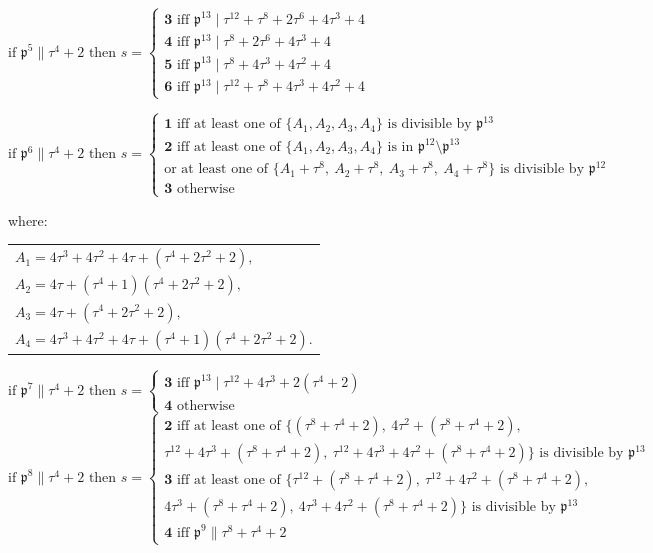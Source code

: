 \documentclass[12pt]{article}
\theoremstyle{remark}
\newcommand{\p}{\mathfrak{p}}
\begin{document}
\noindent
$ \text{if } \mathfrak{p}^5 \parallel \tau^4+2 \text{ then } s = \begin{cases}
    \textbf{3} \text{ iff } \mathfrak{p}^{13} \mid \tau^{12}+\tau^8+2\tau^6+4\tau^3+4\\
    \textbf{4} \text{ iff } \mathfrak{p}^{13} \mid \tau^8+2\tau^6+4\tau^3+4\\
    \textbf{5} \text{ iff } \mathfrak{p}^{13} \mid  \tau^8+4\tau^3+4\tau^2+4\\
    \textbf{6} \text{ iff } \mathfrak{p}^{13} \mid  \tau^{12}+\tau^8+4\tau^3+4\tau^2+4
\end{cases} $

\noindent
$\text{if } \mathfrak{p}^6 \parallel \tau^4+2 \text{ then } s = \begin{cases}
    \textbf{1} \text{ iff at least one of } \{A_1,A_2,A_3,A_4\} \text{ is divisible by } \mathfrak{p}^{13} \\
    \textbf{2} \text{ iff at least one of } \{A_1,A_2,A_3,A_4\}  \text{ is in } \mathfrak{p}^{12}\setminus\p^{13} \\
    \text{or at least one of } \{A_1+\tau^8, \ A_2+\tau^8, \ A_3+\tau^8, \ A_4+\tau^8\} \text{ is divisible by } \mathfrak{p}^{12} \\
    \textbf{3} \text{ otherwise}
\end{cases}$
\begin{center}
where:
\begin{tabular}{@{}l@{}}
    $A_1 = 4\tau^3+4\tau^2+4\tau+(\tau^4+2\tau^2+2),$\\
    $A_2 = 4\tau + (\tau^4+1)(\tau^4+2\tau^2+2),$\\
    $A_3 = 4\tau + (\tau^4+2\tau^2+2), $\\
    $A_4= 4\tau^3+4\tau^2+4\tau+(\tau^4+1)(\tau^4+2\tau^2+2). $
\end{tabular}
\end{center}
$\text{if } \mathfrak{p}^7 \parallel \tau^4+2 \text{ then } s = \begin{cases}
    \textbf{3} \text{ iff } \mathfrak{p}^{13} \mid \tau^{12}+4\tau^3+2(\tau^4+2)\\
    \textbf{4} \text{ otherwise}
\end{cases}$ 
\\
$\text{if } \mathfrak{p}^8 \parallel \tau^4+2 \text{ then } s = \begin{cases}
    \textbf{2} \text{ iff at least one of } \{ (\tau^8+\tau^4+2), \  4\tau^2+ (\tau^8+\tau^4+2), \\
    \tau^{12}+4\tau^3+(\tau^8+\tau^4+2), \ \tau^{12}+4\tau^3+4\tau^2+(\tau^8+\tau^4+2)\} \text{ is divisible by } \mathfrak{p}^{13}\\
    \textbf{3} \text{ iff at least one of } \{ \tau^{12}+(\tau^8+\tau^4+2), \ \tau^{12} + 4\tau^2+ (\tau^8+\tau^4+2), \\
    4\tau^3+(\tau^8+\tau^4+2), \ 4\tau^3+4\tau^2+(\tau^8+\tau^4+2)\} \text{ is divisible by } \mathfrak{p}^{13}\\
    \textbf{4} \text{ iff } \mathfrak{p}^9 \parallel \tau^8+\tau^4+2
\end{cases}$
\end{document}
